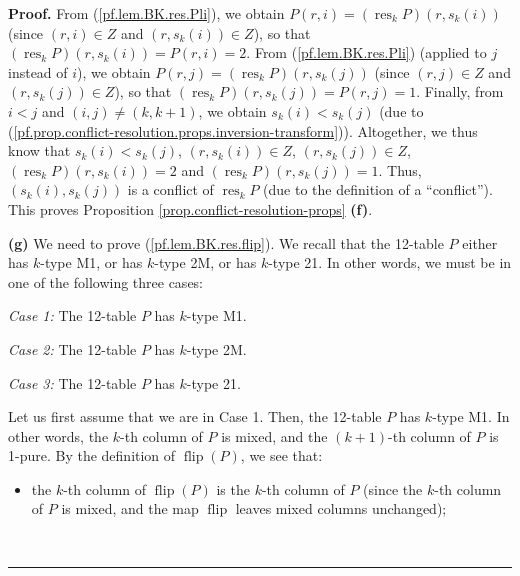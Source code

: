 \documentclass[numbers=enddot,12pt,final,onecolumn,notitlepage]{scrartcl}%
\theoremstyle{definition}
\newenvironment{proof}[1][Proof]{\noindent\textbf{#1.} }{\ \rule{0.5em}{0.5em}}
\newenvironment{verlong}{}{}
\begin{document}
\begin{verlong}
\begin{proof}
From (\ref{pf.lem.BK.res.Pli}), we obtain $P\left(  r,i\right)  =\left(
\operatorname*{res}\nolimits_{k}P\right)  \left(  r,s_{k}\left(  i\right)
\right)  $ (since $\left(  r,i\right)  \in Z$ and $\left(  r,s_{k}\left(
i\right)  \right)  \in Z$), so that $\left(  \operatorname*{res}%
\nolimits_{k}P\right)  \left(  r,s_{k}\left(  i\right)  \right)  =P\left(
r,i\right)  =2$. From (\ref{pf.lem.BK.res.Pli}) (applied to $j$ instead of
$i$), we obtain $P\left(  r,j\right)  =\left(  \operatorname*{res}%
\nolimits_{k}P\right)  \left(  r,s_{k}\left(  j\right)  \right)  $ (since
$\left(  r,j\right)  \in Z$ and $\left(  r,s_{k}\left(  j\right)  \right)  \in
Z$), so that $\left(  \operatorname*{res}\nolimits_{k}P\right)  \left(
r,s_{k}\left(  j\right)  \right)  =P\left(  r,j\right)  =1$. Finally, from
$i<j$ and $\left(  i,j\right)  \neq\left(  k,k+1\right)  $, we obtain
$s_{k}\left(  i\right)  <s_{k}\left(  j\right)  $ (due to
(\ref{pf.prop.conflict-resolution.props.inversion-transform})). Altogether, we
thus know that $s_{k}\left(  i\right)  <s_{k}\left(  j\right)  $, $\left(
r,s_{k}\left(  i\right)  \right)  \in Z$, $\left(  r,s_{k}\left(  j\right)
\right)  \in Z$, $\left(  \operatorname*{res}\nolimits_{k}P\right)  \left(
r,s_{k}\left(  i\right)  \right)  =2$ and $\left(  \operatorname*{res}%
\nolimits_{k}P\right)  \left(  r,s_{k}\left(  j\right)  \right)  =1$. Thus,
$\left(  s_{k}\left(  i\right)  ,s_{k}\left(  j\right)  \right)  $ is a
conflict of $\operatorname*{res}\nolimits_{k}P$ (due to the definition of a
\textquotedblleft conflict\textquotedblright). This proves Proposition
\ref{prop.conflict-resolution-props} \textbf{(f)}.

\textbf{(g)} We need to prove (\ref{pf.lem.BK.res.flip}). We recall that the
12-table $P$ either has $k$-type M1, or has $k$-type 2M, or has $k$-type 21.
In other words, we must be in one of the following three cases:

\textit{Case 1:} The 12-table $P$ has $k$-type M1.

\textit{Case 2:} The 12-table $P$ has $k$-type 2M.

\textit{Case 3:} The 12-table $P$ has $k$-type 21.

Let us first assume that we are in Case 1. Then, the 12-table $P$ has $k$-type
M1. In other words, the $k$-th column of $P$ is mixed, and the $\left(
k+1\right)  $-th column of $P$ is 1-pure. By the definition of
$\operatorname*{flip}\left(  P\right)  $, we see that:

\begin{itemize}
\item the $k$-th column of $\operatorname*{flip}\left(  P\right)  $ is the
$k$-th column of $P$ (since the $k$-th column of $P$ is mixed, and the map
$\operatorname*{flip}$ leaves mixed columns unchanged);


\end{itemize}
\end{proof}
\end{verlong}
\end{document}
